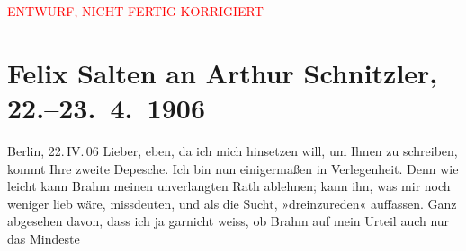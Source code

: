 
\begin{center}
            \textcolor{red}{ENTWURF, NICHT FERTIG KORRIGIERT}
                      \end{center}
            
         
         \renewcommand{\erwaehntePersonen}{Personen: Otto Brahm, Alphonse Daudet, Julius Elias, Paul Goldmann, Adalbert von Goldschmidt, Siegfried Jacobsohn, Emanuel Reicher, Rudolf Rittner, Ottilie Salten, Olga Schnitzler}
         \renewcommand{\erwaehnteOrte}{Orte: Berlin, Lessing-Theater, Wien}
         \renewcommand{\erwaehnteWerke}{Werke: Der Ruf des Lebens. Schauspiel in drei Akten, Der einsame Weg, Der einsame Weg. Schauspiel in fünf Akten, Die Schaubühne, Elga}
               \section[Felix Salten an Arthur Schnitzler, 22.–23. 4. 1906]{ Felix Salten an Arthur Schnitzler, 22.–23. 4. 1906}\nopagebreak{}\rehead{ }\begin{ledgroupsized}[t]{13cm}\normalsize\beginnumbering \toendnotes[C]{\smallbreak\pagebreak[2]} 
\toendnotes[C]{\smallbreak}\pstart
           \raggedleft{}{\pb}Berlin, 22. IV. 06\pend
           \pstart
           Lieber, eben, da ich mich hinsetzen will, um Ihnen zu schreiben,
               kommt Ihre zweite Depesche. Ich bin nun einigermaßen in Verlegenheit. Denn wie leicht
               kann Brahm meinen unverlangten Rath ablehnen;
               kann ihn, was mir noch weniger lieb wäre, missdeuten, und als die Sucht,
               »dreinzureden« auffassen. Ganz abgesehen davon, dass ich ja garnicht weiss, ob Brahm auf mein Urteil auch nur das Mindeste

\end{ledgroupsized}
